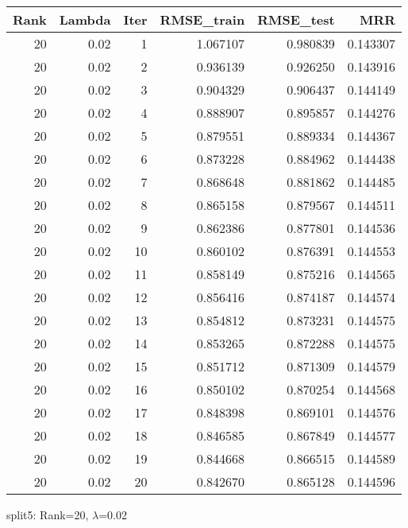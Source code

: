 \begin{tabular}{rrrrrr}
\toprule
 Rank &  Lambda &  Iter &  RMSE\_train &  RMSE\_test &       MRR \\
\midrule
   20 &    0.02 &     1 &    1.067107 &   0.980839 &  0.143307 \\
   20 &    0.02 &     2 &    0.936139 &   0.926250 &  0.143916 \\
   20 &    0.02 &     3 &    0.904329 &   0.906437 &  0.144149 \\
   20 &    0.02 &     4 &    0.888907 &   0.895857 &  0.144276 \\
   20 &    0.02 &     5 &    0.879551 &   0.889334 &  0.144367 \\
   20 &    0.02 &     6 &    0.873228 &   0.884962 &  0.144438 \\
   20 &    0.02 &     7 &    0.868648 &   0.881862 &  0.144485 \\
   20 &    0.02 &     8 &    0.865158 &   0.879567 &  0.144511 \\
   20 &    0.02 &     9 &    0.862386 &   0.877801 &  0.144536 \\
   20 &    0.02 &    10 &    0.860102 &   0.876391 &  0.144553 \\
   20 &    0.02 &    11 &    0.858149 &   0.875216 &  0.144565 \\
   20 &    0.02 &    12 &    0.856416 &   0.874187 &  0.144574 \\
   20 &    0.02 &    13 &    0.854812 &   0.873231 &  0.144575 \\
   20 &    0.02 &    14 &    0.853265 &   0.872288 &  0.144575 \\
   20 &    0.02 &    15 &    0.851712 &   0.871309 &  0.144579 \\
   20 &    0.02 &    16 &    0.850102 &   0.870254 &  0.144568 \\
   20 &    0.02 &    17 &    0.848398 &   0.869101 &  0.144576 \\
   20 &    0.02 &    18 &    0.846585 &   0.867849 &  0.144577 \\
   20 &    0.02 &    19 &    0.844668 &   0.866515 &  0.144589 \\
   20 &    0.02 &    20 &    0.842670 &   0.865128 &  0.144596 \\
\bottomrule
\end{tabular}

\caption{split5: Rank=20, $\lambda$=0.02}
